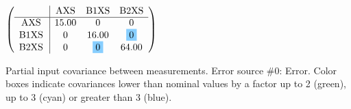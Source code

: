 \begin{table}[H]
\scriptsize
\begin{center}
\renewcommand{\arraystretch}{1.1}
\begin{math}\left(\begin{array}{c|ccc}
 & \mathrm{AXS} & 
\mathrm{B1XS} & 
\mathrm{B2XS} \\
\hline
\mathrm{AXS} \hspace*{2pt} &      15.00 &  0 &  0 \\
\mathrm{B1XS} \hspace*{2pt} &  0 &      16.00 &  \colorbox{SkyBlue1}{$ 0$} \\
\mathrm{B2XS} \hspace*{2pt} &  0 &  \colorbox{SkyBlue1}{$ 0$} &      64.00 \\
\end{array}\right)\end{math}
\caption{Partial input covariance between measurements. Error source \#0: Error. Color boxes indicate covariances lower than nominal values by a factor up to 2 (green), up to 3 (cyan) or greater than 3 (blue).}
\renewcommand{\arraystretch}{1}
\end{center}
\end{table}
